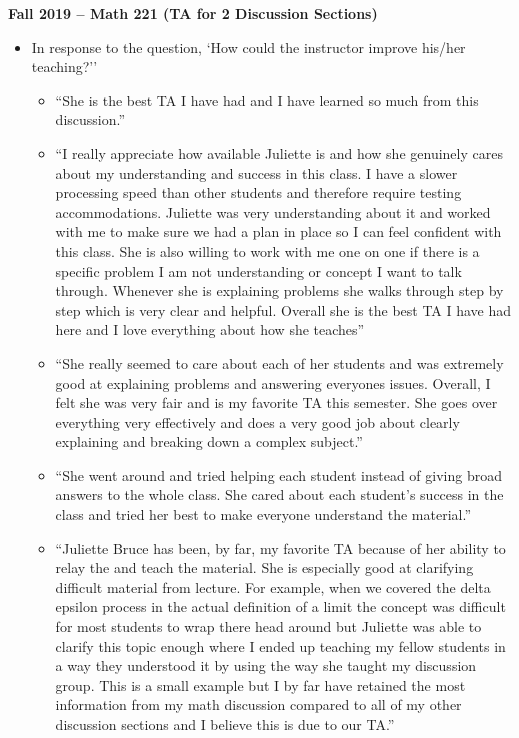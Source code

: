 \documentclass[letterpaper,11pt]{article}
\begin{document}
\textbf{Fall 2019 -- Math 221 (TA for 2 Discussion Sections)}

\begin{itemize}

\item In response to the question, `How could the instructor improve his/her teaching?''
\begin{itemize}
\item ``She is the best TA I have had and I have learned so much from this discussion.''

\item ``I really appreciate how available Juliette is and how she genuinely cares about my understanding and success in this class. I have a slower processing speed than other students and therefore require testing accommodations. Juliette was very understanding about it and worked with me to make sure we had a plan in place so I can feel confident with this class. She is also willing to work with me one on one if there is a specific problem I am not understanding or concept I want to talk through. Whenever she is explaining problems she walks through step by step which is very clear and helpful. Overall she is the best TA I have had here and I love everything about how she teaches''

\item ``She really seemed to care about each of her students and was extremely good at explaining problems and answering everyones issues. Overall, I felt she was very fair and is my favorite TA this semester. She goes over everything very effectively and does a very good job about clearly explaining and breaking down a complex subject.''

\item ``She went around and tried helping each student instead of giving broad answers to the whole class. She cared about each student's success in the class and tried her best to make everyone understand the material.''

\item ``Juliette Bruce has been, by far, my favorite TA because of her ability to relay the and teach the material. She is especially good at clarifying difficult material from lecture. For example, when we covered the delta epsilon process in the actual definition of a limit the concept was difficult for most students to wrap there head around but Juliette was able to clarify this topic enough where I ended up teaching my fellow students in a way they understood it by using the way she taught my discussion group. This is a small example but I by far have retained the most information from my math discussion compared to all of my other discussion sections and I believe this is due to our TA.''


\end{itemize}
\end{itemize}
\end{document}
